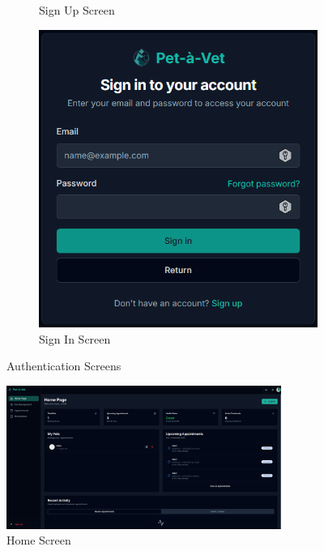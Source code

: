 \documentclass[12pt,a4paper,twoside]{book}
\begin{document}
\begin{figure}[H]
\begin{subfigure}[b]{0.48\textwidth}
        \caption{Sign Up Screen}\label{fig:sign-up-screen}
    \end{subfigure}
    \hfill
    \begin{subfigure}[b]{0.48\textwidth}
        \centering
        \includegraphics[width=\textwidth]{Resources/Final UI/sign-in.png}
        \caption{Sign In Screen}\label{fig:sign-in-screen}
    \end{subfigure}
    \caption{Authentication Screens}\label{fig:final-auth-screens}
\end{figure}

\begin{figure}[H]
  \centering
    \includegraphics[width=0.8\textwidth]{Resources/Final UI/home-screen.png}
    \caption{Home Screen}\label{fig:home-screen}
\end{figure}
\end{document}
